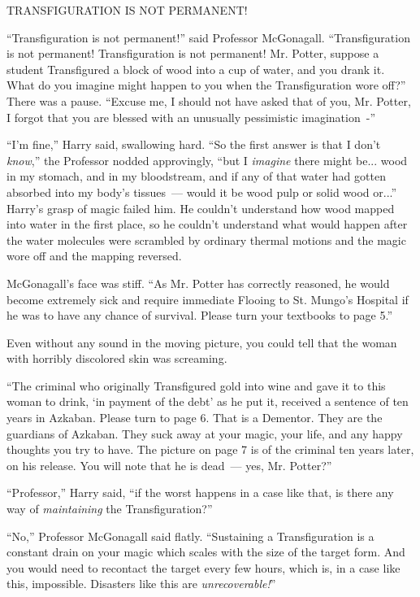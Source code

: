 TRANSFIGURATION IS NOT PERMANENT!

``Transfiguration is not permanent!'' said Professor McGonagall. ``Transfiguration is not permanent! Transfiguration is not permanent! Mr. Potter, suppose a student Transfigured a block of wood into a cup of water, and you drank it. What do you imagine might happen to you when the Transfiguration wore off?'' There was a pause. ``Excuse me, I should not have asked that of you, Mr. Potter, I forgot that you are blessed with an unusually pessimistic imagination~-''

``I'm fine,'' Harry said, swallowing hard. ``So the first answer is that I don't \emph{know},'' the Professor nodded approvingly, ``but I \emph{imagine} there might be... wood in my stomach, and in my bloodstream, and if any of that water had gotten absorbed into my body's tissues~--- would it be wood pulp or solid wood or...'' Harry's grasp of magic failed him. He couldn't understand how wood mapped into water in the first place, so he couldn't understand what would happen after the water molecules were scrambled by ordinary thermal motions and the magic wore off and the mapping reversed.

McGonagall's face was stiff. ``As Mr. Potter has correctly reasoned, he would become extremely sick and require immediate Flooing to St. Mungo's Hospital if he was to have any chance of survival. Please turn your textbooks to page 5.''

Even without any sound in the moving picture, you could tell that the woman with horribly discolored skin was screaming.

``The criminal who originally Transfigured gold into wine and gave it to this woman to drink, `in payment of the debt' as he put it, received a sentence of ten years in Azkaban. Please turn to page 6. That is a Dementor. They are the guardians of Azkaban. They suck away at your magic, your life, and any happy thoughts you try to have. The picture on page 7 is of the criminal ten years later, on his release. You will note that he is dead~--- yes, Mr. Potter?''

``Professor,'' Harry said, ``if the worst happens in a case like that, is there any way of \emph{maintaining} the Transfiguration?''

``No,'' Professor McGonagall said flatly. ``Sustaining a Transfiguration is a constant drain on your magic which scales with the size of the target form. And you would need to recontact the target every few hours, which is, in a case like this, impossible. Disasters like this are \emph{unrecoverable!}''

